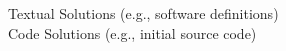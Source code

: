 \documentclass[preview]{standalone}
\begin{document}
Textual Solutions (e.g., software definitions)\\Code Solutions (e.g., initial source code)\\
\end{document}
